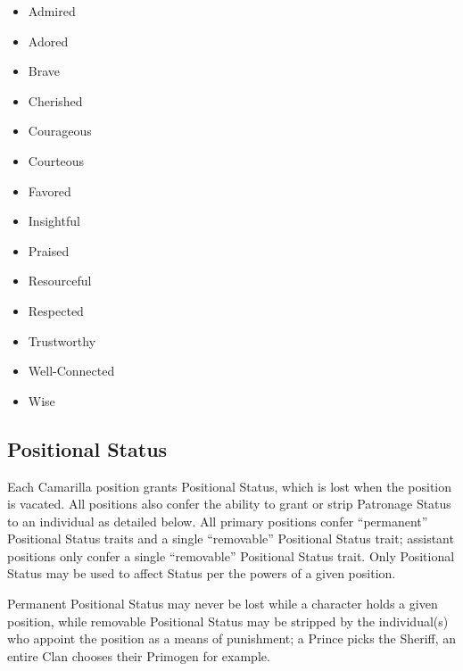 \begin{center}
\begin{minipage}{0.4\textwidth}
	\begin{flushleft}
		\begin{itemize}
			\item Admired
			\item Adored
			\item Brave
			\item Cherished
			\item Courageous
			\item Courteous
			\item Favored
		\end{itemize}
	\end{flushleft}
\end{minipage}
\begin{minipage}{0.4\textwidth}
	\begin{flushright}
		\begin{itemize}
			\item Insightful
			\item Praised
			\item Resourceful
			\item Respected
			\item Trustworthy
			\item Well-Connected
			\item Wise
		\end{itemize}
	\end{flushright}
\end{minipage}
\end{center}

\subsection{Positional Status}

Each Camarilla position grants Positional Status, which is lost when the position 
is vacated. All positions also confer the ability to grant or strip Patronage Status 
to an individual as detailed below.  All primary positions confer ``permanent'' Positional 
Status traits and a single ``removable'' Positional Status trait; assistant positions only 
confer a single ``removable'' Positional Status trait.  Only Positional Status may be used 
to affect Status per the powers of a given position.

Permanent Positional Status may never be lost while a character holds a given position, 
while removable Positional Status may be stripped by the individual(s) who appoint the 
position as a means of punishment; a Prince picks the Sheriff, an entire Clan chooses 
their Primogen for example.

